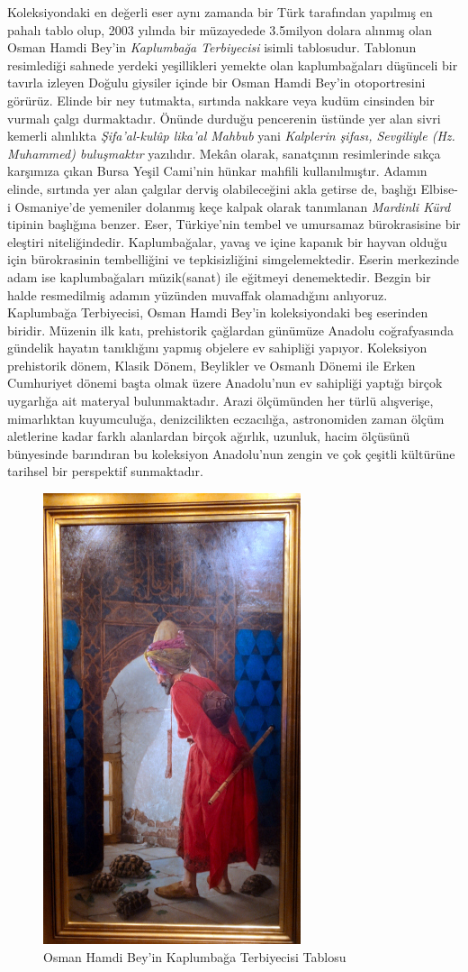 \indent Koleksiyondaki en değerli eser aynı zamanda bir Türk tarafından yapılmış en pahalı tablo olup, 2003 yılında bir müzayedede 3.5milyon dolara alınmış olan Osman Hamdi Bey'in \textit{Kaplumbağa Terbiyecisi} isimli tablosudur. Tablonun resimlediği sahnede yerdeki yeşillikleri yemekte olan kaplumbağaları düşünceli bir tavırla izleyen Doğulu giysiler içinde bir Osman Hamdi Bey'in otoportresini görürüz.  Elinde bir ney tutmakta, sırtında nakkare veya kudüm cinsinden bir vurmalı çalgı durmaktadır. Önünde durduğu pencerenin üstünde yer alan sivri kemerli alınlıkta \textit{Şifa’al-kulûp lika’al Mahbub} yani \textit{Kalplerin şifası, Sevgiliyle (Hz. Muhammed) buluşmaktır} yazılıdır. Mekân olarak, sanatçının resimlerinde sıkça karşımıza çıkan Bursa Yeşil Cami’nin hünkar mahfili kullanılmıştır. Adamın elinde, sırtında yer alan çalgılar derviş olabileceğini akla getirse de, başlığı Elbise-i Osmaniye’de yemeniler dolanmış keçe kalpak olarak tanımlanan \textit{Mardinli Kürd} tipinin başlığına benzer. Eser, Türkiye'nin tembel ve umursamaz bürokrasisine bir eleştiri niteliğindedir. Kaplumbağalar, yavaş ve içine kapanık bir hayvan olduğu için bürokrasinin tembelliğini ve tepkisizliğini simgelemektedir. Eserin merkezinde adam ise kaplumbağaları müzik(sanat) ile eğitmeyi denemektedir. Bezgin bir halde resmedilmiş adamın yüzünden muvaffak olamadığını anlıyoruz. Kaplumbağa Terbiyecisi, Osman Hamdi Bey’in koleksiyondaki beş eserinden biridir.\newline
\indent Müzenin ilk katı, prehistorik çağlardan günümüze Anadolu coğrafyasında gündelik hayatın tanıklığını yapmış objelere ev sahipliği yapıyor. Koleksiyon prehistorik dönem, Klasik Dönem, Beylikler ve Osmanlı Dönemi ile Erken Cumhuriyet dönemi başta olmak üzere Anadolu’nun ev sahipliği yaptığı birçok uygarlığa ait materyal bulunmaktadır. Arazi ölçümünden her türlü alışverişe, mimarlıktan kuyumculuğa, denizcilikten eczacılığa, astronomiden zaman ölçüm aletlerine kadar farklı alanlardan birçok ağırlık, uzunluk, hacim ölçüsünü bünyesinde barındıran bu koleksiyon Anadolu’nun zengin ve çok çeşitli kültürüne tarihsel bir perspektif sunmaktadır.
\begin{figure}[H]
    \centering
    \includegraphics[height=0.95\textheight]{assets/kaplumbaga_terbiyecisi.jpg}
    \caption{Osman Hamdi Bey'in Kaplumbağa Terbiyecisi Tablosu}
\end{figure}